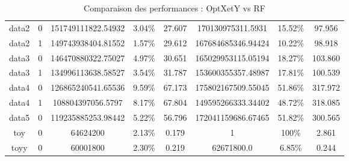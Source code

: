 \begin{table}[h!tbp]
\begin{tabular}{|c|c||c|c|c||c|c|c|}
        \hline
        data2                                     & 0                                                   & 151749111822.54932                            & 3.04\%       & 27.607              & 170130975311.5931  & 15.52\%      & 97.956              \\
        data2                                     & 1                                                   & 149743938404.81552                            & 1.57\%       & 29.612              & 167684685346.94424 & 10.22\%      & 98.918              \\
        \hline
        data3                                     & 0                                                   & 146470880322.75027                            & 4.97\%       & 30.651              & 165029953115.05194 & 18.27\%      & 103.860             \\
        data3                                     & 1                                                   & 134996113638.58527                            & 3.54\%       & 31.787              & 153600355357.48987 & 17.81\%      & 100.539             \\
        \hline
        data4                                     & 0                                                   & 126865240541.65536                            & 9.59\%       & 67.173              & 175802167509.55045 & 51.86\%      & 317.972             \\
        data4                                     & 1                                                   & 108804397056.5797                             & 8.17\%       & 67.804              & 149595266333.34402 & 48.72\%      & 318.085             \\
        \hline
        data5                                     & 0                                                   & 119235885253.98442                            & 5.22\%       & 56.796              & 172041159686.67465 & 51.82\%      & 300.565             \\
        \hline
        toy                                       & 0                                                   & 64624200                                      & 2.13\%       & 0.179               & 1                  & 100\%        & 2.861               \\
        \hline
        toyy                                      & 0                                                   & 60001800                                      & 2.30\%       & 0.219               & 62671800.0         & 6.85\%       & 0.244               \\
        \hline
    \end{tabular}
    \caption{Comparaison des performances : OptXetY vs RF}
    \label{tab:optxety_rf}
\end{table}
